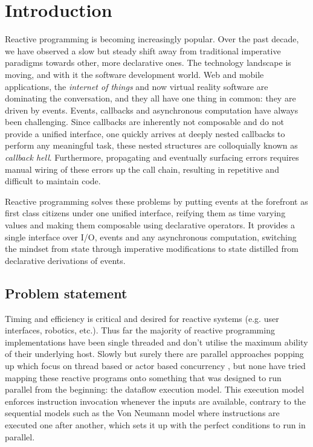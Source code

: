 \chapter{Introduction}

Reactive programming is becoming increasingly popular. Over the past decade, we have observed a slow but steady shift away from traditional imperative paradigms towards other, more declarative ones.
The technology landscape is moving, and with it the software development world. Web and mobile applications, the \textit{internet of things} and now virtual reality software are dominating the conversation, and they all have one thing in common: they are driven by events. Events, callbacks and asynchronous computation have always been challenging. Since callbacks are inherently not composable and do not provide a unified interface, one quickly arrives at deeply nested callbacks to perform any meaningful task, these nested structures are colloquially known as \textit{callback hell}. Furthermore, propagating and eventually surfacing errors requires manual wiring of these errors up the call chain, resulting in repetitive and difficult to maintain code. 

Reactive programming solves these problems by putting events at the forefront as first class citizens under one unified interface, reifying them as time varying values and making them composable using declarative operators. It provides a single interface over I/O, events and any asynchronous computation, switching the mindset from state through imperative modifications to state distilled from declarative derivations of events. 

\section{Problem statement}

Timing and efficiency is critical and desired for reactive systems (e.g. user interfaces, robotics, etc.).
Thus far the majority of reactive programming implementations have been single threaded and don't utilise the maximum ability of their underlying host. Slowly but surely there are parallel approaches popping up which focus on thread based or actor based concurrency \citep{peterson_parallel_2000}, but none have tried mapping these reactive programs onto something that was designed to run parallel from the beginning: the dataflow execution model. This execution model enforces instruction invocation whenever the inputs are available, contrary to the sequential models such as the Von Neumann model where instructions are executed one after another, which sets it up with the perfect conditions to run in parallel.

